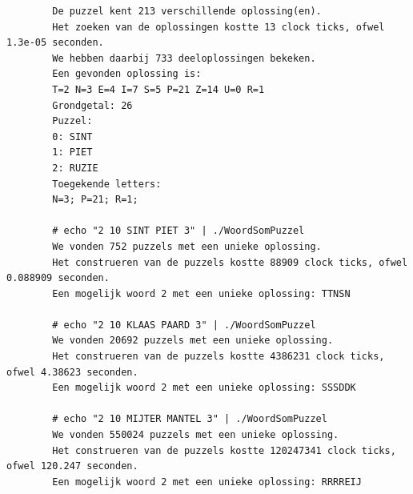 \documentclass[twocolumn,10pt]{article}
\begin{document}
\begin{appendices}
\begin{lstlisting}
        De puzzel kent 213 verschillende oplossing(en).
        Het zoeken van de oplossingen kostte 13 clock ticks, ofwel 1.3e-05 seconden.
        We hebben daarbij 733 deeloplossingen bekeken.
        Een gevonden oplossing is:
        T=2 N=3 E=4 I=7 S=5 P=21 Z=14 U=0 R=1
        Grondgetal: 26 
        Puzzel:
        0: SINT
        1: PIET
        2: RUZIE
        Toegekende letters:
        N=3; P=21; R=1; 

        # echo "2 10 SINT PIET 3" | ./WoordSomPuzzel
        We vonden 752 puzzels met een unieke oplossing.
        Het construeren van de puzzels kostte 88909 clock ticks, ofwel 0.088909 seconden.
        Een mogelijk woord 2 met een unieke oplossing: TTNSN

        # echo "2 10 KLAAS PAARD 3" | ./WoordSomPuzzel
        We vonden 20692 puzzels met een unieke oplossing.
        Het construeren van de puzzels kostte 4386231 clock ticks, ofwel 4.38623 seconden.
        Een mogelijk woord 2 met een unieke oplossing: SSSDDK

        # echo "2 10 MIJTER MANTEL 3" | ./WoordSomPuzzel
        We vonden 550024 puzzels met een unieke oplossing.
        Het construeren van de puzzels kostte 120247341 clock ticks, ofwel 120.247 seconden.
        Een mogelijk woord 2 met een unieke oplossing: RRRREIJ

        
    \end{lstlisting}
 
\end{appendices}
\end{document}
